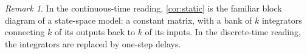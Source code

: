 \documentclass[11pt,a4paper]{article}
\theoremstyle{plain}
\theoremstyle{definition}
\theoremstyle{remark}
\newtheorem{remark}[theorem]{Remark}
\begin{document}
\begin{remark}
    In the continuous-time reading, \cref{cor:static} is the familiar block diagram of a state-space model: a constant matrix, with a bank of $k$ integrators connecting $k$ of its outputs back to $k$ of its inputs.
    In the discrete-time reading, the integrators are replaced by one-step delays.
\end{remark}
\end{document}
